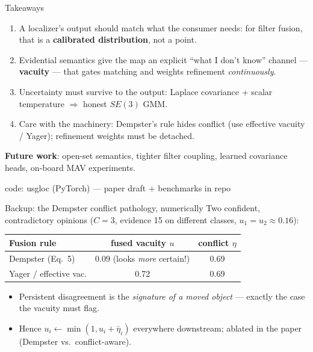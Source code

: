 \documentclass[aspectratio=169,10pt]{beamer}
\newcommand{\srcnote}[1]{{\tiny\color{ink!55}#1}}
\newcommand{\good}[1]{{\color{uLow}#1}}
\newcommand{\bad}[1]{{\color{uHigh}#1}}
\begin{document}
\begin{frame}{Takeaways}
  \begin{enumerate}
    \item A localizer's output should match what the consumer needs:
          for filter fusion, that is a \textbf{calibrated distribution},
          not a point.
    \item Evidential semantics give the map an explicit ``what I don't
          know'' channel --- \textbf{vacuity} --- that gates matching and
          weights refinement \emph{continuously}.
    \item Uncertainty must survive to the output: Laplace covariance +
          scalar temperature $\Rightarrow$ honest $SE(3)$ GMM.
    \item Care with the machinery: Dempster's rule hides conflict (use
          effective vacuity / Yager); refinement weights must be detached.
  \end{enumerate}
  \vspace{2mm}
  \textbf{Future work}: open-set semantics, tighter filter coupling, learned
  covariance heads, on-board MAV experiments.
  \vspace{2mm}
  \begin{center}
     \quad
    \srcnote{code: usgloc (PyTorch) --- paper draft + benchmarks in repo}
  \end{center}
\end{frame}

\appendix
\begin{frame}[plain]
  \centering\Large{}
\end{frame}

\begin{frame}{Backup: the Dempster conflict pathology, numerically}
  Two confident, contradictory opinions ($C=3$, evidence 15 on different
  classes, $u_1 = u_2 \approx 0.16$):
  \begin{center}
    \begin{tabular}{lcc}
      \toprule
      Fusion rule & fused vacuity $u$ & conflict $\eta$\\
      \midrule
      Dempster (Eq.~5)       & \bad{0.09} (looks \emph{more} certain!) & 0.69\\
      Yager / effective vac. & \good{0.72} & 0.69\\
      \bottomrule
    \end{tabular}
  \end{center}
  \vspace{1mm}
  \begin{itemize}
    \item Persistent disagreement is the \emph{signature of a moved object}
          --- exactly the case the vacuity must flag.
    \item Hence $u_i \leftarrow \min(1, u_i + \bar\eta_i)$ everywhere
          downstream; ablated in the paper (Dempster vs.\ conflict-aware).
  \end{itemize}
\end{frame}
\end{document}

